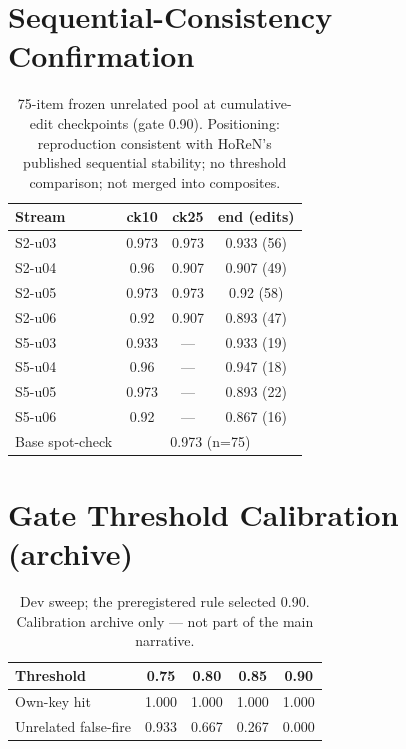 \section{Sequential-Consistency Confirmation}
\begin{table}[h]\centering
\caption{75-item frozen unrelated pool at cumulative-edit checkpoints (gate 0.90). Positioning: reproduction consistent with HoReN's published sequential stability; no threshold comparison; not merged into composites.}
\label{tab:seqcheck}
\small\begin{tabular}{lccc}\toprule
Stream & ck10 & ck25 & end (edits) \\ \midrule
S2-u03 & 0.973 & 0.973 & 0.933 (56) \\
S2-u04 & 0.96 & 0.907 & 0.907 (49) \\
S2-u05 & 0.973 & 0.973 & 0.92 (58) \\
S2-u06 & 0.92 & 0.907 & 0.893 (47) \\
S5-u03 & 0.933 & --- & 0.933 (19) \\
S5-u04 & 0.96 & --- & 0.947 (18) \\
S5-u05 & 0.973 & --- & 0.893 (22) \\
S5-u06 & 0.92 & --- & 0.867 (16) \\
Base spot-check & \multicolumn{3}{c}{0.973 (n=75)} \\
\bottomrule
\end{tabular}
\end{table}

\section{Gate Threshold Calibration (archive)}
\begin{table}[h]\centering
\caption{Dev sweep; the preregistered rule selected 0.90. Calibration archive only --- not part of the main narrative.}
\label{tab:gate}
\begin{tabular}{lcccc}\toprule
Threshold & 0.75 & 0.80 & 0.85 & 0.90 \\ \midrule
Own-key hit & 1.000 & 1.000 & 1.000 & 1.000 \\
Unrelated false-fire & 0.933 & 0.667 & 0.267 & 0.000 \\
\bottomrule
\end{tabular}
\end{table}

